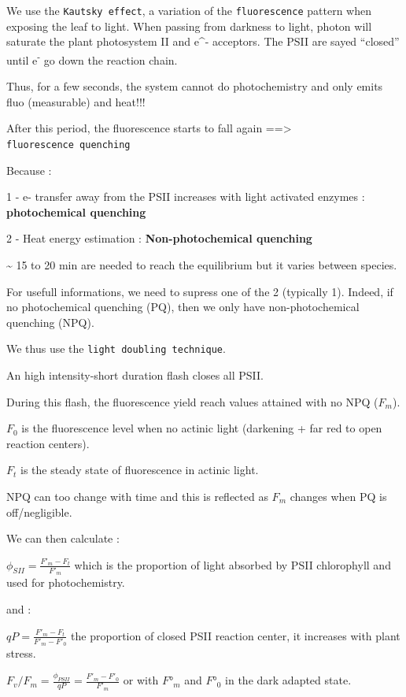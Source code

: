 \documentclass[
  12pt,
  american,
  a4paper,
  extrafontsizes,onecolumn,openright
  ]{memoir}
\begin{document}
We use the \texttt{Kautsky\ effect}, a variation of the \texttt{fluorescence} pattern when exposing the leaf to light.
When passing from darkness to light, photon will saturate the plant photosystem II and e\^{}- acceptors.
The PSII are sayed \enquote{closed} until e\textsuperscript{-} go down the reaction chain.

Thus, for a few seconds, the system cannot do photochemistry and only emits fluo (measurable) and heat!!!

After this period, the fluorescence starts to fall again ==\textgreater{} \texttt{fluorescence\ quenching}

Because :

1 - e- transfer away from the PSII increases with light activated enzymes : \textbf{photochemical quenching}

2 - Heat energy estimation : \textbf{Non-photochemical quenching}

\textasciitilde{} 15 to 20 min are needed to reach the equilibrium but it varies between species.

For usefull informations, we need to supress one of the 2 (typically 1).
Indeed, if no photochemical quenching (PQ), then we only have non-photochemical quenching (NPQ).

We thus use the \texttt{light\ doubling\ technique}.

An high intensity-short duration flash closes all PSII.

During this flash, the fluorescence yield reach values attained with no NPQ (\(F_m\)).

\(F_0\) is the fluorescence level when no actinic light (darkening + far red to open reaction centers).

\(F_t\) is the steady state of fluorescence in actinic light.

NPQ can too change with time and this is reflected as \(F_m\) changes when PQ is off/negligible.

We can then calculate :

\(\phi _{SII} = \frac{F'_m-F_t}{F'_m}\) which is the proportion of light absorbed by PSII chlorophyll and used for photochemistry.

and :

\(qP = \frac{F'_m-F_t}{F'_m-F'_0}\) the proportion of closed PSII reaction center, it increases with plant stress.

\(F_v/F_m=\frac{\phi _{PSII}}{qP}=\frac{F'_m-F'_0}{F'_m}\) or with \(F°_m\) and \(F°_0\) in the dark adapted state.
\end{document}
